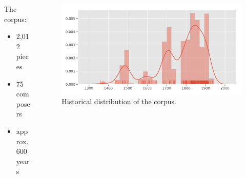 \begin{frame}{\insertsectionhead}

  \begin{columns}
    \begin{column}{.3\textwidth}
      The corpus:
      \begin{itemize}
        \item 2,012 pieces
        \item 75 composers
        \item approx. 600 years
      \end{itemize}
    \end{column}
    \begin{column}{.7\textwidth}
      \begin{figure}
        \centering
        \includegraphics[width=\textwidth]{img/piece_dist.pdf}
        \caption{Historical distribution of the corpus.}
        \label{}
      \end{figure}
    \end{column}
  \end{columns}
\end{frame}

